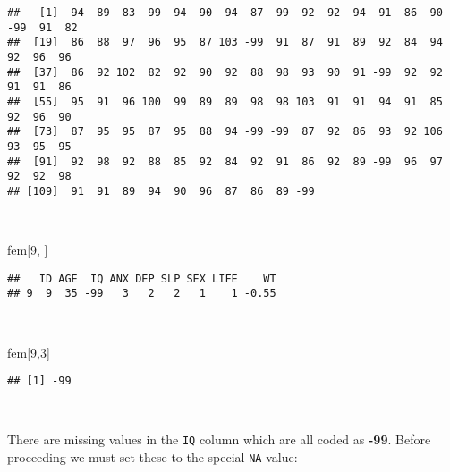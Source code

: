 \documentclass[
  12pt,
  a4paper]{book}
\newenvironment{Shaded}{\begin{snugshade}}{\end{snugshade}}
\newcommand{\ConstantTok}[1]{\textcolor[rgb]{0.00,0.00,0.00}{#1}}
\newcommand{\DecValTok}[1]{\textcolor[rgb]{0.00,0.00,0.81}{#1}}
\newcommand{\NormalTok}[1]{#1}
\newcommand{\OtherTok}[1]{\textcolor[rgb]{0.56,0.35,0.01}{#1}}
\newcommand{\SpecialCharTok}[1]{\textcolor[rgb]{0.00,0.00,0.00}{#1}}
\begin{document}
\begin{verbatim}
##   [1]  94  89  83  99  94  90  94  87 -99  92  92  94  91  86  90 -99  91  82
##  [19]  86  88  97  96  95  87 103 -99  91  87  91  89  92  84  94  92  96  96
##  [37]  86  92 102  82  92  90  92  88  98  93  90  91 -99  92  92  91  91  86
##  [55]  95  91  96 100  99  89  89  98  98 103  91  91  94  91  85  92  96  90
##  [73]  87  95  95  87  95  88  94 -99 -99  87  92  86  93  92 106  93  95  95
##  [91]  92  98  92  88  85  92  84  92  91  86  92  89 -99  96  97  92  92  98
## [109]  91  91  89  94  90  96  87  86  89 -99
\end{verbatim}

~

\begin{Shaded}
\begin{Highlighting}[]
\NormalTok{fem[}\DecValTok{9}\NormalTok{, ]}
\end{Highlighting}
\end{Shaded}

\begin{verbatim}
##   ID AGE  IQ ANX DEP SLP SEX LIFE    WT
## 9  9  35 -99   3   2   2   1    1 -0.55
\end{verbatim}

~

\begin{Shaded}
\begin{Highlighting}[]
\NormalTok{fem[}\DecValTok{9}\NormalTok{,}\DecValTok{3}\NormalTok{]}
\end{Highlighting}
\end{Shaded}

\begin{verbatim}
## [1] -99
\end{verbatim}

~

There are missing values in the \texttt{IQ} column which are all coded as \textbf{-99}. Before proceeding we must set these to
the special \texttt{NA} value:

~

\begin{Shaded}
\end{Shaded}

~
\end{document}
